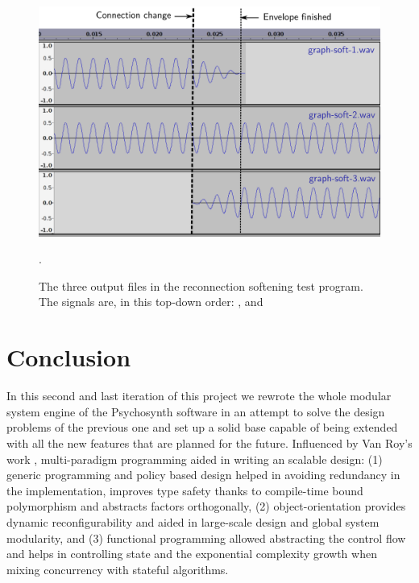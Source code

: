 \begin{figure}[h!]
  \centering
  \includegraphics[width=\textwidth]{pic/sound-vis.pdf}
  \caption[The three output files in the reconnection softening test
  program.]{The three output files in the reconnection softening test
    program. The signals are, in this top-down order:
    ,  and
    }.
  \label{fig:soft-audacity}
\end{figure}


\section{Conclusion}

In this second and last iteration of this project we rewrote the whole
modular system engine of the Psychosynth software in an attempt to
solve the design problems of the previous one and set up a solid base
capable of being extended with all the new features that are planned
for the future. Influenced by Van Roy's work \cite{roy04concepts},
multi-paradigm programming aided in writing an scalable design: (1)
generic programming and policy based design helped in avoiding
redundancy in the implementation, improves type safety thanks to
compile-time bound polymorphism and abstracts factors orthogonally,
(2) object-orientation provides dynamic reconfigurability and aided in
large-scale design and global system modularity, and (3) functional
programming allowed abstracting the control flow and helps in
controlling state and the exponential complexity growth when mixing
concurrency with stateful algorithms.

